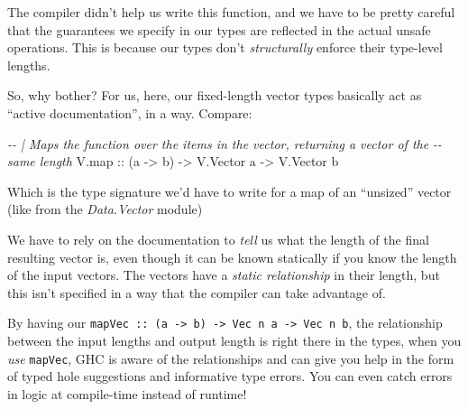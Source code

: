\documentclass[]{article}
\newenvironment{Shaded}{}{}
\newcommand{\CommentTok}[1]{\textcolor[rgb]{0.38,0.63,0.69}{\textit{#1}}}
\newcommand{\DataTypeTok}[1]{\textcolor[rgb]{0.56,0.13,0.00}{#1}}
\newcommand{\NormalTok}[1]{#1}
\newcommand{\OtherTok}[1]{\textcolor[rgb]{0.00,0.44,0.13}{#1}}
\begin{document}
The compiler didn't help us write this function, and we have to be pretty
careful that the guarantees we specify in our types are reflected in the actual
unsafe operations. This is because our types don't \emph{structurally} enforce
their type-level lengths.

So, why bother? For us, here, our fixed-length vector types basically act as
``active documentation'', in a way. Compare:

\begin{Shaded}
\begin{Highlighting}[]
\CommentTok{{-}{-} | Maps the function over the items in the vector, returning a vector of the}
\CommentTok{{-}{-} same length}
\NormalTok{V.map}\OtherTok{ ::}\NormalTok{ (a }\OtherTok{{-}\textgreater{}}\NormalTok{ b) }\OtherTok{{-}\textgreater{}} \DataTypeTok{V.Vector}\NormalTok{ a }\OtherTok{{-}\textgreater{}} \DataTypeTok{V.Vector}\NormalTok{ b}
\end{Highlighting}
\end{Shaded}

Which is the type signature we'd have to write for a map of an ``unsized''
vector (like from the \emph{Data.Vector} module)

We have to rely on the documentation to \emph{tell} us what the length of the
final resulting vector is, even though it can be known statically if you know
the length of the input vectors. The vectors have a \emph{static relationship}
in their length, but this isn't specified in a way that the compiler can take
advantage of.

By having our
\texttt{mapVec\ ::\ (a\ -\textgreater{}\ b)\ -\textgreater{}\ Vec\ n\ a\ -\textgreater{}\ Vec\ n\ b},
the relationship between the input lengths and output length is right there in
the types, when you \emph{use} \texttt{mapVec}, GHC is aware of the
relationships and can give you help in the form of typed hole suggestions and
informative type errors. You can even catch errors in logic at compile-time
instead of runtime!
\end{document}
